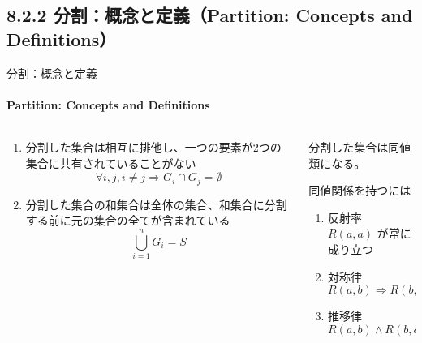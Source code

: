\subsection{8.2.2 分割：概念と定義（Partition: Concepts and Definitions）}
\begin{frame}[shrink=10]{分割：概念と定義}
\framesubtitle{Partition: Concepts and Definitions}
\begin{columns}
\begin{column}{0.5\textwidth}
\begin{enumerate}
\item 分割した集合は相互に排他し、一つの要素が2つの集合に共有されていることがない
    \[ \forall i,j,i\neq j \Rightarrow G_i \cap G_j = \emptyset \]
\item 分割した集合の和集合は全体の集合、和集合に分割する前に元の集合の全てが含まれている
    \[ \bigcup_{i=1}^{n} G_i = S \]
\end{enumerate}

\end{column}
\begin{column}{0.5\textwidth}
分割した集合は同値類になる。

同値関係を持つには
\begin{enumerate}
\item 反射率 \\ $R(a,a)$ が常に成り立つ
\item 対称律 \\ $R(a,b) \Rightarrow R(b,a) $
\item 推移律 \\ $R(a,b) \wedge R(b,c) \Rightarrow R(a,c)$
\end{enumerate}
\end{column}
\end{columns}
\end{frame}
